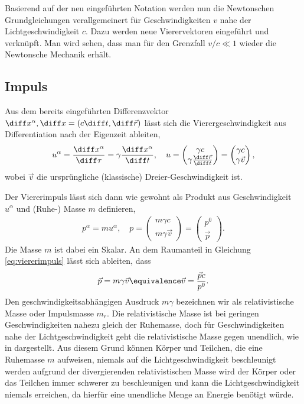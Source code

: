 Basierend auf der neu eingeführten Notation werden nun die Newtonschen Grundgleichungen verallgemeinert für Geschwindigkeiten $v$ nahe der Lichtgeschwindigkeit $c$.
Dazu werden neue Vierervektoren eingeführt und verknüpft. Man wird sehen, dass man für den Grenzfall $v/c\ll 1$ wieder die Newtonsche Mechanik erhält.


\subsection{Impuls}

Aus dem bereits eingeführten Differenzvektor $\diff x^\alpha, \diff x=(c\diff t,\diff \vec r)$ lässt sich die Vierergeschwindigkeit aus Differentiation nach der Eigenzeit ableiten,
\begin{align*}
    u^\alpha=\frac{\diff x^\alpha}{\diff\tau} = \gamma\frac{\diff x^\alpha}{\diff t}, \quad u=\begin{pmatrix}\gamma c \\ \gamma \frac{\diff\vec r}{\diff t} \end{pmatrix}=\begin{pmatrix}\gamma c \\ \gamma \vec v \end{pmatrix},
\end{align*}
wobei $\vec v$ die ursprüngliche (klassische) Dreier-Geschwindigkeit ist.

Der Viererimpuls lässt sich dann wie gewohnt als Produkt aus Geschwindigkeit $u^\alpha$ und (Ruhe-) Masse $m$ definieren,
\begin{align}
    \label{eq:viererimpuls}
    \boxed{p^\alpha=mu^\alpha, \quad p=\begin{pmatrix}m\gamma c \\ m \gamma \vec v\end{pmatrix} = \begin{pmatrix}p^0 \\ \vec p \end{pmatrix}.}
\end{align}
Die Masse $m$ ist dabei ein Skalar. An dem Raumanteil in Gleichung \eqref{eq:viererimpuls} lässt sich ableiten, dass
\begin{align*}
    \vec p = m\gamma \vec v \equivalence\vec v= \frac{\vec pc}{p^0}.
\end{align*}
Den geschwindigkeitsabhängigen Ausdruck $m\gamma$ bezeichnen wir als relativistische Masse oder Impulsmasse $m_r$.
Die relativistische Masse ist bei geringen Geschwindigkeiten nahezu gleich der Ruhemasse, doch für Geschwindigkeiten nahe der Lichtgeschwindigkeit geht die relativistische Masse gegen unendlich, wie in  dargestellt.
Aus diesem Grund können Körper und Teilchen, die eine Ruhemasse $m$ aufweisen, niemals auf die Lichtgeschwindigkeit beschleunigt werden \textendash{} aufgrund der divergierenden relativistischen Masse wird der Körper oder das Teilchen immer schwerer zu beschleunigen und kann die Lichtgeschwindigkeit niemals erreichen, da hierfür eine unendliche Menge an Energie benötigt würde.

